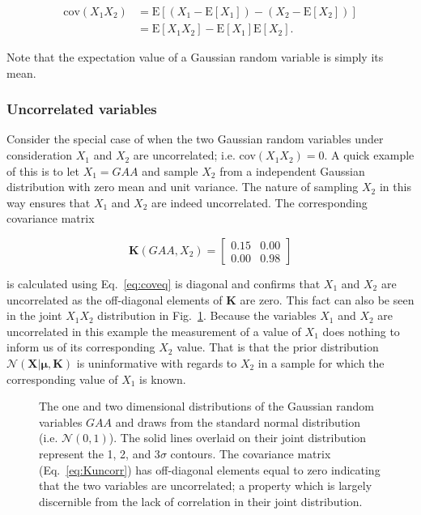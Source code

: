 \begin{align}
  \text{cov}(X_1X_2) &= \text{E}[(X_1-\text{E}[X_1]) - (X_2-\text{E}[X_2])] \\
  &= \text{E}[X_1X_2] - \text{E}[X_1]\text{E}[X_2].
  \label{eq:coveq}
\end{align}

\noindent Note that the expectation value of a Gaussian random variable is simply
its mean. \\

\subsubsection{Uncorrelated variables}
Consider the special case of when the two Gaussian random variables under
consideration $X_1$ and $X_2$ are uncorrelated; i.e. cov$(X_1X_2)=0$. A quick
example of this is to let $X_1=GAA$ and sample $X_2$ from a independent Gaussian
distribution with zero mean and unit variance.
The nature of sampling $X_2$ in this way ensures
that $X_1$ and $X_2$ are indeed uncorrelated. The corresponding covariance matrix

\begin{equation}
  \mathbf{K}(GAA,X_2) =
  \begin{bmatrix}
    0.15 & 0.00 \\
    0.00 & 0.98
  \end{bmatrix}
  \label{eq:Kuncorr}
\end{equation}

\noindent is calculated using Eq.~\ref{eq:coveq} is diagonal and confirms that
$X_1$ and $X_2$ are uncorrelated as the off-diagonal elements of $\mathbf{K}$ are zero.
This fact can also be seen in the joint $X_1X_2$ distribution in Fig.~\ref{fig:uncorr2d}.
Because the variables $X_1$ and $X_2$ are uncorrelated in this example the
measurement of a value of $X_1$ does nothing to inform us of its corresponding
$X_2$ value. That is that the prior distribution
$\mathcal{N}(\mathbf{X}|\boldsymbol{\mu},\mathbf{K})$ is uninformative with regards to
$X_2$ in a sample for which the corresponding value of $X_1$ is known. \\

\begin{figure}
  \centering
  \caption[Uncorrelated Gaussian random variables in two dimensions.]
      {The one and two dimensional distributions of the Gaussian random
        variables $GAA$ and draws from the standard normal distribution (i.e. $\mathcal{N}(0,1)$).
        The solid
    lines overlaid on their joint distribution represent the 1, 2, and 3$\sigma$
    contours. The covariance matrix (Eq.~\ref{eq:Kuncorr}) has off-diagonal
    elements equal to zero indicating that the two variables are uncorrelated;
    a property which is largely discernible from the lack of correlation in their joint
    distribution.}
  \label{fig:uncorr2d}
\end{figure}

